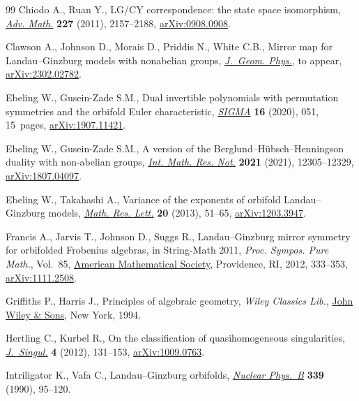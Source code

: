 \documentclass[10pt,a4paper]{article}
\numberwithin{equation}{section}
\begin{document}
\begin{thebibliography}{99}
Chiodo A., Ruan Y., L{G}/{CY} correspondence: the state space isomorphism,
 \href{https://doi.org/10.1016/j.aim.2011.04.011}{\textit{Adv. Math.}} \textbf{227} (2011), 2157--2188, \href{https://arxiv.org/abs/0908.0908}{arXiv:0908.0908}.

Clawson A., Johnson D., Morais D., Priddis N., White C.B., Mirror map for
 {L}andau--{G}inzburg models with nonabelian groups, \href{https://doi.org/10.1016/j.geomphys.2024.105161}{\textit{J.~Geom. Phys.}},
 {t}o appear, \href{https://arxiv.org/abs/2302.02782}{arXiv:2302.02782}.

Ebeling W., Gusein-Zade S.M., Dual invertible polynomials with permutation
 symmetries and the orbifold {E}uler characteristic, \href{https://doi.org/10.3842/SIGMA.2020.051}{\textit{SIGMA}}
 \textbf{16} (2020), 051, 15~pages, \href{https://arxiv.org/abs/1907.11421}{arXiv:1907.11421}.

Ebeling W., Gusein-Zade S.M., A version of the
 {B}erglund--{H}\"ubsch--{H}enningson duality with non-abelian groups,
 \href{https://doi.org/10.1093/imrn/rnz167}{\textit{Int. Math. Res. Not.}} \textbf{2021} (2021), 12305--12329,
 \href{https://arxiv.org/abs/1807.04097}{arXiv:1807.04097}.

Ebeling W., Takahashi A., Variance of the exponents of orbifold
 {L}andau--{G}inzburg models, \href{https://doi.org/10.4310/MRL.2013.v20.n1.a5}{\textit{Math. Res. Lett.}} \textbf{20} (2013),
 51--65, \href{https://arxiv.org/abs/1203.3947}{arXiv:1203.3947}.

Francis A., Jarvis T., Johnson D., Suggs R., Landau--{G}inzburg mirror symmetry
 for orbifolded {F}robenius algebras, in String-{M}ath 2011, \textit{Proc.
 Sympos. Pure Math.}, Vol.~85, \href{https://doi.org/10.1090/pspum/085/1389}{American Mathematical Society}, Providence, RI,
 2012, 333--353, \href{https://arxiv.org/abs/1111.2508}{arXiv:1111.2508}.

Griffiths P., Harris J., Principles of algebraic geometry, \textit{Wiley Classics Lib.},
 \href{https://doi.org/10.1002/9781118032527}{John Wiley \& Sons}, New York, 1994.

Hertling C., Kurbel R., On the classification of quasihomogeneous
 singularities, \href{https://doi.org/10.5427/jsing.2012.4h}{\textit{J.~Singul.}} \textbf{4} (2012), 131--153,
 \href{https://arxiv.org/abs/1009.0763}{arXiv:1009.0763}.

Intriligator K., Vafa C., Landau--{G}inzburg orbifolds, \href{https://doi.org/10.1016/0550-3213(90)90535-L}{\textit{Nuclear
 Phys.~B}} \textbf{339} (1990), 95--120.


\end{thebibliography}
\end{document}
